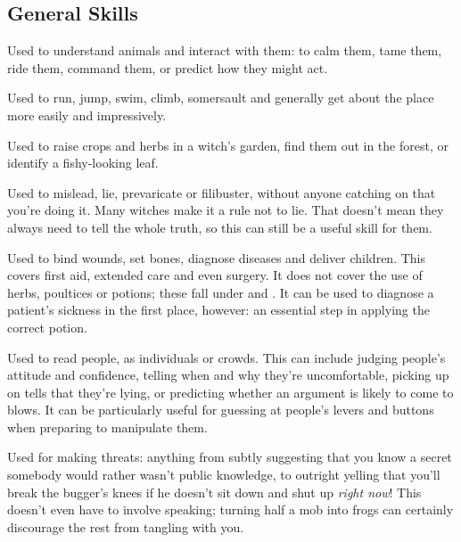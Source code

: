 \subsection{General Skills}


Used to understand animals and interact with them: to calm them, tame them, ride them, command them, or predict how they might act.


Used to run, jump, swim, climb, somersault and generally get about the place more easily and impressively.


Used to raise crops and herbs in a witch's garden, find them out in the forest, or identify a fishy-looking leaf.


Used to mislead, lie, prevaricate or filibuster, without anyone catching on that you're doing it.
Many witches make it a rule not to lie.
That doesn't mean they always need to tell the whole truth, so this can still be a useful skill for them.


Used to bind wounds, set bones, diagnose diseases and deliver children.
This covers first aid, extended care and even surgery.
It does not cover the use of herbs, poultices or potions; these fall under  and .
It can be used to diagnose a patient's sickness in the first place, however: an essential step in applying the correct potion.


Used to read people, as individuals or crowds.
This can include judging people's attitude and confidence, telling when and why they're uncomfortable, picking up on tells that they're lying, or predicting whether an argument is likely to come to blows.
It can be particularly useful for guessing at people's levers and buttons when preparing to manipulate them.


Used for making threats: anything from subtly suggesting that you know a secret somebody would rather wasn't public knowledge, to outright yelling that you'll break the bugger's knees if he doesn't sit down and shut up \emph{right now}!
This doesn't even have to involve speaking; turning half a mob into frogs can certainly discourage the rest from tangling with you.


